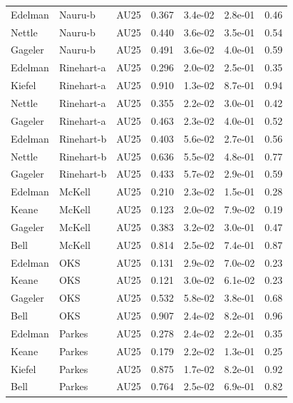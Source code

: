 \documentclass{monashthesis}
\begin{document}
\begin{center}
\begin{longtable}{lllllll}
Edelman & Nauru-b & AU25 & 0.367 & 3.4e-02 & 2.8e-01 & 0.46 \\
Nettle & Nauru-b & AU25 & 0.440 & 3.6e-02 & 3.5e-01 & 0.54 \\
Gageler & Nauru-b & AU25 & 0.491 & 3.6e-02 & 4.0e-01 & 0.59 \\
Edelman & Rinehart-a & AU25 & 0.296 & 2.0e-02 & 2.5e-01 & 0.35 \\
Kiefel & Rinehart-a & AU25 & 0.910 & 1.3e-02 & 8.7e-01 & 0.94 \\
Nettle & Rinehart-a & AU25 & 0.355 & 2.2e-02 & 3.0e-01 & 0.42 \\
Gageler & Rinehart-a & AU25 & 0.463 & 2.3e-02 & 4.0e-01 & 0.52 \\
Edelman & Rinehart-b & AU25 & 0.403 & 5.6e-02 & 2.7e-01 & 0.56 \\
Nettle & Rinehart-b & AU25 & 0.636 & 5.5e-02 & 4.8e-01 & 0.77 \\
Gageler & Rinehart-b & AU25 & 0.433 & 5.7e-02 & 2.9e-01 & 0.59 \\
Edelman & McKell & AU25 & 0.210 & 2.3e-02 & 1.5e-01 & 0.28 \\
Keane & McKell & AU25 & 0.123 & 2.0e-02 & 7.9e-02 & 0.19 \\
Gageler & McKell & AU25 & 0.383 & 3.2e-02 & 3.0e-01 & 0.47 \\
Bell & McKell & AU25 & 0.814 & 2.5e-02 & 7.4e-01 & 0.87 \\
Edelman & OKS & AU25 & 0.131 & 2.9e-02 & 7.0e-02 & 0.23 \\
Keane & OKS & AU25 & 0.121 & 3.0e-02 & 6.1e-02 & 0.23 \\
Gageler & OKS & AU25 & 0.532 & 5.8e-02 & 3.8e-01 & 0.68 \\
Bell & OKS & AU25 & 0.907 & 2.4e-02 & 8.2e-01 & 0.96 \\
Edelman & Parkes & AU25 & 0.278 & 2.4e-02 & 2.2e-01 & 0.35 \\
Keane & Parkes & AU25 & 0.179 & 2.2e-02 & 1.3e-01 & 0.25 \\
Kiefel & Parkes & AU25 & 0.875 & 1.7e-02 & 8.2e-01 & 0.92 \\
Bell & Parkes & AU25 & 0.764 & 2.5e-02 & 6.9e-01 & 0.82 \\
\end{longtable}
\end{center}
\end{document}
